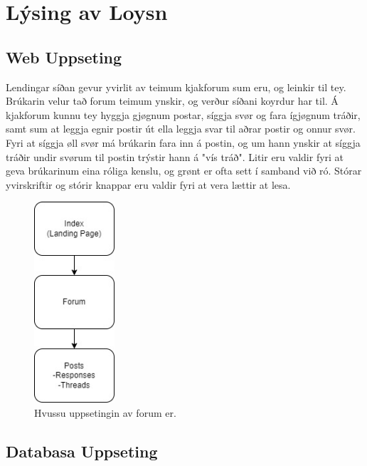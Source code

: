 \documentclass{article}
\begin{document}
\section{Lýsing av Loysn}

\subsection{Web Uppseting}
\par Lendingar síðan gevur yvirlit av teimum kjakforum sum eru, og leinkir til tey. Brúkarin
velur tað forum teimum ynskir, og verður síðani koyrdur har til. Á kjakforum kunnu tey
hyggja gjøgnum postar, síggja svør og fara ígjøgnum tráðir, samt sum at leggja egnir postir
út ella leggja svar til aðrar postir og onnur svør. Fyri at síggja øll svør má brúkarin fara inn
á postin, og um hann ynskir at síggja tráðir undir svørum til postin trýstir hann á "vís tráð".
Litir eru valdir fyri at geva brúkarinum eina róliga kenslu, og grønt er ofta sett í samband
við ró. Stórar yvirskriftir og stórir knappar eru valdir fyri at vera lættir at lesa. 


\begin{figure}[H]
    \centering
    \includegraphics[width=3cm]{Structure.jpg} 
    \caption{Hvussu uppsetingin av forum er.} 
  \end{figure}

\subsection{Databasa Uppseting}
\end{document}
